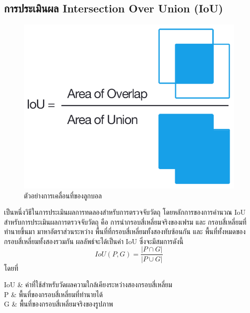 \subsection*{การประเมินผล Intersection Over Union (IoU)}
\begin{figure}[!ht]
	\centering
	\includegraphics[scale=0.3]{chapter2/images/iou_equation.png}
		\caption{ตัวอย่างการเคลื่อนที่ของลูกบอล}
    	\label{fig:iou_equation}
\end{figure}

เป็นหนึ่งวิธีในการประเมินผลการทดลองสำหรับการตรวจจับวัตถุ โดยหลักการของการคำนวณ IoU สำหรับการประเมินผลการตรวจจับวัตถุ คือ การนำกรอบสี่เหลี่ยมจริงของเฟรม และ กรอบสี่เหลี่ยมที่ทำนายขึ้นมา มาหาอัตราส่วนระหว่าง พื้นที่ที่กรอบสี่เหลี่ยมทั้งสองทับซ้อนกัน และ พื้นที่ทั้งหมดของกรอบสี่เหลี่ยมทั้งสองรวมกัน ผลลัพธ์จะได้เป็นค่า IoU ซึ่งจะมีสมการดังนี้
\begin{equation}
IoU(P,G) = \frac{\left| P \cap G \right|}{\left| P \cup  G \right|}					
\end{equation}
โดยที่
\begin{conditions}
IoU			&  ค่าที่ใช้สำหรับวัดผลความใกล้เคียงระหว่างสองกรอบสี่เหลี่ยม    \\
P			&  พื้นที่ของกรอบสี่เหลี่ยมที่ทำนายได้	\\
G			&  พื้นที่ของกรอบสี่เหลี่ยมจริงของรูปภาพ					\\
\end{conditions}

